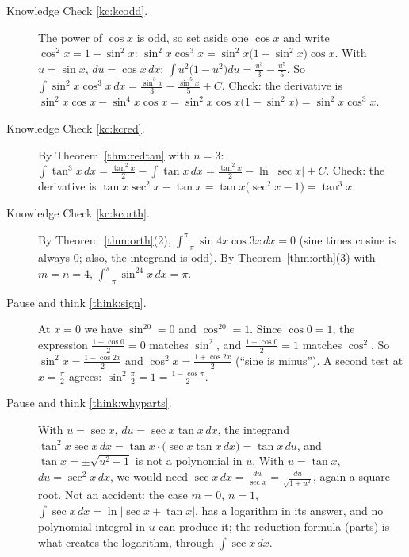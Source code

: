 \documentclass[11pt]{article}
\begin{document}
\begin{description}
  \item[Knowledge Check \ref{kc:kcodd}.] The power of $\cos x$ is odd, so set aside one $\cos x$ and write $\cos^2x=1-\sin^2x$: $\sin^2x\cos^3x=\sin^2x\big(1-\sin^2x\big)\cos x$. With $u=\sin x$, $du=\cos x\,dx$: $\int u^2\big(1-u^2\big)du=\frac{u^3}3-\frac{u^5}5$. So $\int\sin^2x\cos^3x\,dx=\frac{\sin^3x}3-\frac{\sin^5x}5+C$. Check: the derivative is $\sin^2x\cos x-\sin^4x\cos x=\sin^2x\cos x\big(1-\sin^2x\big)=\sin^2x\cos^3x$.

  \item[Knowledge Check \ref{kc:kcred}.] By Theorem~\ref{thm:redtan} with $n=3$: $\int\tan^3x\,dx=\frac{\tan^2x}2-\int\tan x\,dx=\frac{\tan^2x}2-\ln\lvert\sec x\rvert+C$. Check: the derivative is $\tan x\sec^2x-\tan x=\tan x\big(\sec^2x-1\big)=\tan^3x$.

  \item[Knowledge Check \ref{kc:kcorth}.] By Theorem~\ref{thm:orth}(2), $\int_{-\pi}^{\pi}\sin4x\cos3x\,dx=0$ (sine times cosine is always $0$; also, the integrand is odd). By Theorem~\ref{thm:orth}(3) with $m=n=4$, $\int_{-\pi}^{\pi}\sin^24x\,dx=\pi$.

  \item[Pause and think \ref{think:sign}.] At $x=0$ we have $\sin^20=0$ and $\cos^20=1$. Since $\cos0=1$, the expression $\frac{1-\cos0}2=0$ matches $\sin^2$, and $\frac{1+\cos0}2=1$ matches $\cos^2$. So $\sin^2x=\frac{1-\cos2x}2$ and $\cos^2x=\frac{1+\cos2x}2$ (``sine is minus''). A second test at $x=\frac\pi2$ agrees: $\sin^2\frac\pi2=1=\frac{1-\cos\pi}2$.

  \item[Pause and think \ref{think:whyparts}.] With $u=\sec x$, $du=\sec x\tan x\,dx$, the integrand $\tan^2x\sec x\,dx=\tan x\cdot\big(\sec x\tan x\,dx\big)=\tan x\,du$, and $\tan x=\pm\sqrt{u^2-1}$ is not a polynomial in $u$. With $u=\tan x$, $du=\sec^2x\,dx$, we would need $\sec x\,dx=\frac{du}{\sec x}=\frac{du}{\sqrt{1+u^2}}$, again a square root. Not an accident: the case $m=0$, $n=1$, $\int\sec x\,dx=\ln\lvert\sec x+\tan x\rvert$, has a logarithm in its answer, and no polynomial integral in $u$ can produce it; the reduction formula (parts) is what creates the logarithm, through $\int\sec x\,dx$.


\end{description}
\end{document}
